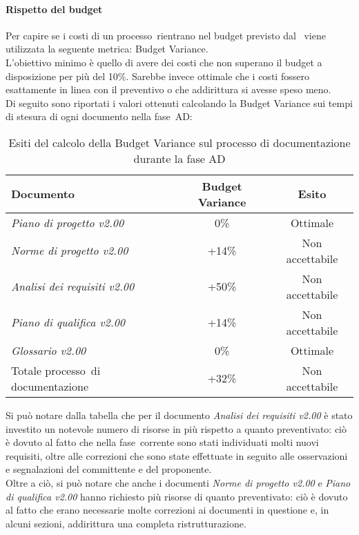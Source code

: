 \documentclass[../PianoDiQualifica.tex]{subfiles}
\begin{document}
\begin{appendices}
			\paragraph{Rispetto del budget}
			Per capire se i costi di un processo\g\ rientrano nel budget previsto dal \pianodiprogetto\ viene utilizzata la seguente metrica: Budget Variance.\\
			L'obiettivo minimo è quello di avere dei costi che non superano il budget a disposizione per più del 10\%. Sarebbe invece ottimale che i costi fossero esattamente in linea con il preventivo o che addirittura si avesse speso meno.\\
			Di seguito sono riportati i valori ottenuti calcolando la Budget Variance sui tempi di stesura di ogni documento nella fase\g\ AD:
			\begin{table}[H]
				\centering
				\begin{tabular}{l * {2}{c}}
					\toprule
					\textbf{Documento} & \textbf{Budget Variance} & \textbf{Esito} \\
					\midrule
					\textit{Piano di progetto v2.00} & 0\% &  Ottimale \\
					\textit{Norme di progetto v2.00} & +14\% & Non accettabile \\
					\textit{Analisi dei requisiti v2.00} & +50\% & Non accettabile \\
					\textit{Piano di qualifica v2.00} & +14\% & Non accettabile \\
					\textit{Glossario v2.00} & 0\% & Ottimale \\
					Totale processo\g\ di documentazione & +32\% & Non accettabile \\
					\bottomrule
				\end{tabular}
				\caption{Esiti del calcolo della Budget Variance sul processo di documentazione durante la fase AD}
				\label{tab:esiti_budget_variance}
			\end{table}
			Si può notare dalla tabella che per il documento \textit{Analisi dei requisiti v2.00} è stato investito un notevole numero di risorse in più rispetto a quanto preventivato: ciò è dovuto al fatto che nella fase\g\ corrente sono stati individuati molti nuovi requisiti, oltre alle correzioni che sono state effettuate in seguito alle osservazioni e segnalazioni del committente e del proponente.\\
			Oltre a ciò, si può notare che anche i documenti \textit{Norme di progetto v2.00} e \textit{Piano di qualifica v2.00} hanno richiesto più risorse di quanto preventivato: ciò è dovuto al fatto che erano necessarie molte correzioni ai documenti in questione e, in alcuni sezioni, addirittura una completa ristrutturazione. 
						

\end{appendices}
\end{document}
